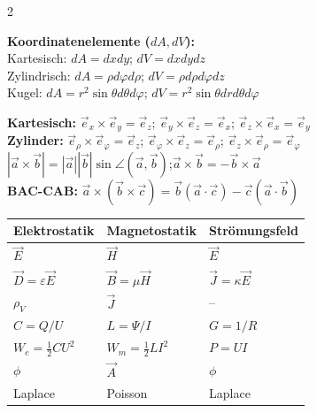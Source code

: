 \documentclass[a4paper, 7.5pt]{extarticle}
\begin{document}
\begin{multicols*}{2}
\begin{tcolorbox}[title={Nützliche Integrale \& Geometrie (Maximalfassung)}]
\smallskip
\textbf{Koordinatenelemente ($dA, dV$):}\\
Kartesisch: $dA = dx dy$; \quad $dV = dx dy dz$\\[2pt]
Zylindrisch: $dA = \rho d\varphi d\rho$; \quad $dV = \rho d\rho d\varphi dz$\\[2pt]
Kugel: $dA = r^2 \sin\theta d\theta d\varphi$; \quad $dV = r^2 \sin\theta dr d\theta d\varphi$
\end{tcolorbox}

\begin{tcolorbox}[title={Kreuzprodukt \& Vektorregeln}]
\textbf{Kartesisch:} $\vec{e}_x\times\vec{e}_y=\vec{e}_z$;\; $\vec{e}_y\times\vec{e}_z=\vec{e}_x$;\; $\vec{e}_z\times\vec{e}_x=\vec{e}_y$\\
\textbf{Zylinder:} $\vec{e}_\rho\times\vec{e}_\varphi=\vec{e}_z$;\; $\vec{e}_\varphi\times\vec{e}_z=\vec{e}_\rho$;\; $\vec{e}_z\times\vec{e}_\rho=\vec{e}_\varphi$\\[3pt]
$|\vec{a}\times\vec{b}| = |\vec{a}||\vec{b}|\sin\angle(\vec{a},\vec{b})$;\quad $\vec{a}\times\vec{b} = -\vec{b}\times\vec{a}$\\
\textbf{BAC-CAB:} $\vec{a}\times(\vec{b}\times\vec{c}) = \vec{b}(\vec{a}\cdot\vec{c})-\vec{c}(\vec{a}\cdot\vec{b})$
\end{tcolorbox}

\begin{tcolorbox}[title={Analogietabelle der Feldtypen}]
\begin{tabular}{@{}p{2cm}p{2cm}p{2cm}@{}}
\toprule
\textbf{Elektrostatik} & \textbf{Magnetostatik} & \textbf{Strömungsfeld}\\
\midrule
$\vec{E}$ \;\text{\textcolor{boxtitle}{[\(V/m\)]}} & $\vec{H}$ \;\text{\textcolor{boxtitle}{[\(A/m\)]}} & $\vec{E}$ \;\text{\textcolor{boxtitle}{[\(V/m\)]}}\\
$\vec{D}=\varepsilon\vec{E}$ & $\vec{B}=\mu\vec{H}$ & $\vec{J}=\kappa\vec{E}$\\
$\rho_V$ \;\text{\textcolor{boxtitle}{[\(C/m^3\)]}} & $\vec{J}$ \;\text{\textcolor{boxtitle}{[\(A/m^2\)]}} & --\\
$C=Q/U$ & $L=\Psi/I$ & $G=1/R$\\
$W_e=\tfrac{1}{2}CU^2$ & $W_m=\tfrac{1}{2}LI^2$ & $P=UI$\\
$\phi$ & $\vec{A}$ & $\phi$\\
Laplace & Poisson & Laplace\\
\bottomrule
\end{tabular}
\end{tcolorbox}


\end{multicols*}
\end{document}
